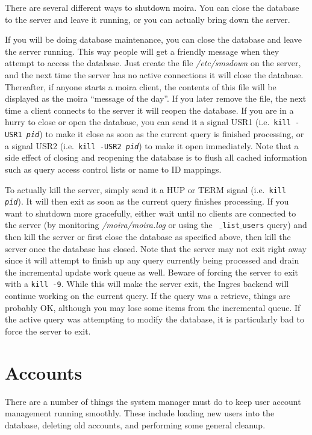 \documentclass{book}
\begin{document}
There are several different ways to shutdown moira.  You can close the
database to the server and leave it running, or you can actually bring
down the server.

If you will be doing database maintenance, you can close the database
and leave the server running.  This way people will get a friendly
message when they attempt to access the database.  Just create the
file {\em /etc/smsdown} on the server, and the next time the server
has no active connections it will close the database.  Thereafter, if
anyone starts a moira client, the contents of this file will be
displayed as the moira ``message of the day''.  If you later remove
the file, the next time a client connects to the server it will reopen
the database.  If you are in a hurry to close or open the database,
you can send it a signal USR1 (i.e.\ {\tt kill -USR1 {\em pid}}) to
make it close as soon as the current query is finished processing, or
a signal USR2 (i.e.\ {\tt kill -USR2 {\em pid}}) to make it open
immediately.  Note that a side effect of closing and reopening the
database is to flush all cached information such as query access
control lists or name to ID mappings.

To actually kill the server, simply send it a HUP or TERM signal
(i.e.\ {\tt kill {\em pid}}).  It will then exit as soon as the
current query finishes processing.  If you want to shutdown more
gracefully, either wait until no clients are connected to the server
(by monitoring {\em /moira/moira.log} or using the {\tt
$\_$list$\_$users} query) and then kill the server or first close the
database as specified above, then kill the server once the database
has closed.  Note that the server may not exit right away since it
will attempt to finish up any query currently being processed and
drain the incremental update work queue as well.  Beware of forcing
the server to exit with a {\tt kill -9}.  While this will make the
server exit, the Ingres backend will continue working on the current
query.  If the query was a retrieve, things are probably OK, although
you may lose some items from the incremental queue.  If the active
query was attempting to modify the database, it is particularly bad to
force the server to exit.

\section{Accounts}

There are a number of things the system manager must do to keep user
account management running smoothly.  These include loading new users
into the database, deleting old accounts, and performing some general cleanup.
\end{document}
